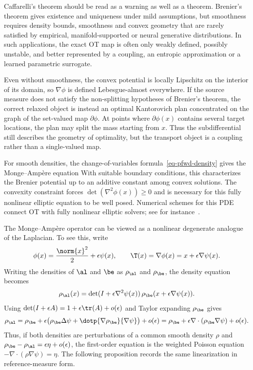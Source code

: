 \begin{rem}
	Caffarelli's theorem should be read as a warning as well as a theorem. Brenier's theorem gives existence and uniqueness under mild assumptions, but smoothness requires density bounds, smoothness and convex geometry that are rarely satisfied by empirical, manifold-supported or neural generative distributions. In such applications, the exact OT map is often only weakly defined, possibly unstable, and better represented by a coupling, an entropic approximation or a learned parametric surrogate.

	Even without smoothness, the convex potential is locally Lipschitz on the interior of its domain, so $\nabla\phi$ is defined Lebesgue-almost everywhere. If the source measure does not satisfy the non-splitting hypotheses of Brenier's theorem, the correct relaxed object is instead an optimal Kantorovich plan concentrated on the graph of the set-valued map $\partial\phi$. At points where $\partial\phi(x)$ contains several target locations, the plan may split the mass starting from $x$. Thus the subdifferential still describes the geometry of optimality, but the transport object is a coupling rather than a single-valued map.
\end{rem}

For smooth densities, the change-of-variables formula~\eqref{eq-pfwd-density} gives the Monge--Amp\`ere equation
With suitable boundary conditions, this characterizes the Brenier potential up to an additive constant among convex solutions. The convexity constraint forces $\det(\nabla^2\phi(x))\geq0$ and is necessary for this fully nonlinear elliptic equation to be well posed. Numerical schemes for this PDE connect OT with fully nonlinear elliptic solvers; see for instance~\cite{benamou2014numerical,froese2011convergent}.

The Monge--Amp\`ere operator can be viewed as a nonlinear degenerate analogue of the Laplacian. To see this, write
\[
	\phi(x)=\frac{\norm{x}^2}{2}+\epsilon\psi(x),
	\qquad
	\T(x)=\nabla\phi(x)=x+\epsilon\nabla\psi(x).
\]
Writing the densities of $\al$ and $\be$ as $\rho_\al$ and $\rho_\be$, the density equation becomes
\[
	\rho_\al(x)
	=
	\det(I+\epsilon\nabla^2\psi(x))\,
	\rho_\be(x+\epsilon\nabla\psi(x)).
\]
Using $\det(I+\epsilon A)=1+\epsilon\tr(A)+o(\epsilon)$ and Taylor expanding $\rho_\be$ gives
\[
	\rho_\al
	=
	\rho_\be
	+\epsilon\bigl(\rho_\be\Delta\psi+\dotp{\nabla\rho_\be}{\nabla\psi}\bigr)
	+o(\epsilon)
	=
	\rho_\be+\epsilon\nabla\cdot(\rho_\be\nabla\psi)+o(\epsilon).
\]
Thus, if both densities are perturbations of a common smooth density $\rho$ and $\rho_\be-\rho_\al=\epsilon\eta+o(\epsilon)$, the first-order equation is the weighted Poisson equation $-\nabla\cdot(\rho\nabla\psi)=\eta$. The following proposition records the same linearization in reference-measure form.

